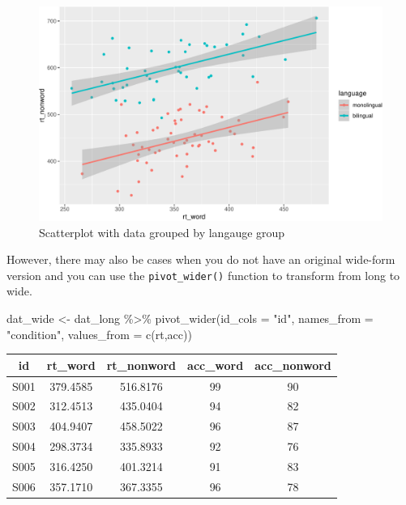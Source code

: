 \documentclass[
  english,
  doc,floatsintext]{apa6}
\newenvironment{Shaded}{\begin{snugshade}}{\end{snugshade}}
\newcommand{\AttributeTok}[1]{\textcolor[rgb]{0.77,0.63,0.00}{#1}}
\newcommand{\FunctionTok}[1]{\textcolor[rgb]{0.00,0.00,0.00}{#1}}
\newcommand{\NormalTok}[1]{#1}
\newcommand{\OtherTok}[1]{\textcolor[rgb]{0.56,0.35,0.01}{#1}}
\newcommand{\SpecialCharTok}[1]{\textcolor[rgb]{0.00,0.00,0.00}{#1}}
\newcommand{\StringTok}[1]{\textcolor[rgb]{0.31,0.60,0.02}{#1}}
\begin{document}
\begin{figure}

{\centering \includegraphics[width=1\linewidth]{images/unnamed-chunk-14-1} 

}

\caption{Scatterplot with data grouped by langauge group}\label{fig:unnamed-chunk-14}
\end{figure}

However, there may also be cases when you do not have an original wide-form version and you can use the \texttt{pivot\_wider()} function to transform from long to wide.

\begin{Shaded}
\begin{Highlighting}[]
\NormalTok{dat\_wide }\OtherTok{\textless{}{-}}\NormalTok{ dat\_long }\SpecialCharTok{\%\textgreater{}\%}
  \FunctionTok{pivot\_wider}\NormalTok{(}\AttributeTok{id\_cols =} \StringTok{"id"}\NormalTok{,}
              \AttributeTok{names\_from =} \StringTok{"condition"}\NormalTok{, }
              \AttributeTok{values\_from =} \FunctionTok{c}\NormalTok{(rt,acc))}
\end{Highlighting}
\end{Shaded}

\begin{tabular}{c|c|c|c|c}
\hline
id & rt\_word & rt\_nonword & acc\_word & acc\_nonword\\
\hline
S001 & 379.4585 & 516.8176 & 99 & 90\\
\hline
S002 & 312.4513 & 435.0404 & 94 & 82\\
\hline
S003 & 404.9407 & 458.5022 & 96 & 87\\
\hline
S004 & 298.3734 & 335.8933 & 92 & 76\\
\hline
S005 & 316.4250 & 401.3214 & 91 & 83\\
\hline
S006 & 357.1710 & 367.3355 & 96 & 78\\
\hline
\end{tabular}
\end{document}
